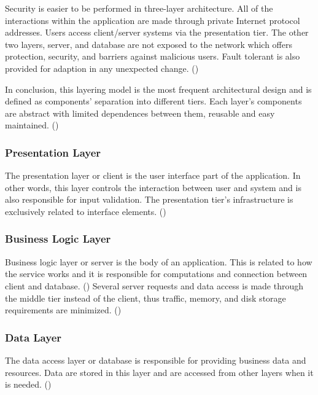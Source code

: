 Security is easier to be performed in three-layer architecture. All of the interactions within the application are made through private Internet protocol addresses. Users access client/server systems via the presentation tier. The other two layers, server, and database are not exposed to the network which offers protection, security, and barriers against malicious users. Fault tolerant is also provided for adaption in any unexpected change. (\cite{Reference2})\par

In conclusion, this layering model is the most frequent architectural design and is defined as components' separation into different tiers. Each layer's components are abstract with limited dependences between them, reusable and easy maintained. (\cite{Reference2}) \par

\subsubsection{Presentation Layer}
The presentation layer or client is the user interface part of the application. In other words, this layer controls the interaction between user and system and is also responsible for input validation. The presentation tier's infrastructure is exclusively related to interface elements. (\cite{Reference2})\par

\subsubsection{Business Logic Layer}
Business logic layer or server is the body of an application. This is related to how the service works and it is responsible for computations and connection between client and database. (\cite{Reference2}) Several server requests and data access is made through the middle tier instead of the client, thus traffic, memory, and disk storage requirements are minimized. (\cite{Reference5})\par

\subsubsection{Data Layer}
The data access layer or database is responsible for providing business data and resources. Data are stored in this layer and are accessed from other layers when it is needed. (\cite{Reference2})\par


